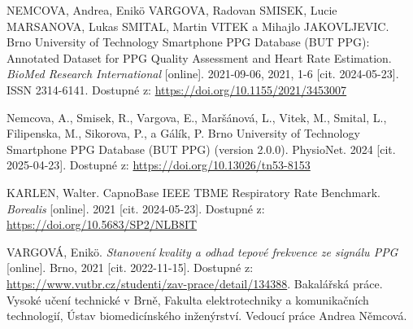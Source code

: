 

\begin{thebibliography}{99}

		NEMCOVA, Andrea, Enikö VARGOVA, Radovan SMISEK, Lucie MARSANOVA, Lukas SMITAL, Martin VITEK a Mihajlo JAKOVLJEVIC.
		Brno University of Technology Smartphone PPG Database (BUT PPG): Annotated Dataset for PPG Quality Assessment and Heart Rate Estimation.
		\emph{BioMed Research International} [online].
		2021-09-06, 2021, 1-6 [cit. 2024-05-23].
		ISSN 2314-6141.
		Dostupné z: \url{https://doi.org/10.1155/2021/3453007}

		Nemcova, A., Smisek, R., Vargova, E., Maršánová, L., Vitek, M., Smital, L., Filipenska, M., Sikorova, P., a Gálík, P.
		Brno University of Technology Smartphone PPG Database (BUT PPG) (version 2.0.0).
		PhysioNet.
		2024 [cit. 2025-04-23].
		Dostupné z: \url{https://doi.org/10.13026/tn53-8153}

		KARLEN, Walter.
		CapnoBase IEEE TBME Respiratory Rate Benchmark.
		\emph{Borealis} [online].
		2021 [cit. 2024-05-23].
		Dostupné z: \url{https://doi.org/10.5683/SP2/NLB8IT}


		VARGOVÁ, Enikö.
		\emph{Stanovení kvality a odhad tepové frekvence ze signálu PPG} [online].
		Brno, 2021 [cit. 2022-11-15].
		Dostupné z: \url{https://www.vutbr.cz/studenti/zav-prace/detail/134388}.
		Bakalářská práce. Vysoké učení technické v Brně, Fakulta elektrotechniky a komunikačních technologií, Ústav biomedicínského inženýrství.
		Vedoucí práce Andrea Němcová.


\end{thebibliography}
